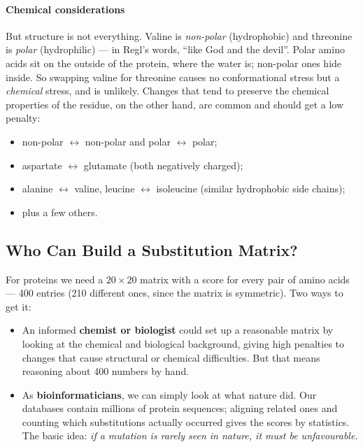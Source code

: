 \documentclass[11pt, oneside]{book}
\let\originalsubsection\subsection
\renewcommand{\subsection}{\Needspace{6\baselineskip}\originalsubsection}
\begin{document}
\paragraph{Chemical considerations}
But structure is not everything. Valine is \emph{non-polar} (hydrophobic) and
threonine is \emph{polar} (hydrophilic) --- in Regl's words, ``like God and
the devil''. Polar amino acids sit on the outside of the protein, where the
water is; non-polar ones hide inside. So swapping valine for threonine causes
no conformational stress but a \emph{chemical} stress, and is unlikely. Changes
that tend to preserve the chemical properties of the residue, on the other
hand, are common and should get a low penalty:
\begin{itemize}
  \item non-polar $\leftrightarrow$ non-polar and polar $\leftrightarrow$ polar;
  \item aspartate $\leftrightarrow$ glutamate (both negatively charged);
  \item alanine $\leftrightarrow$ valine, leucine $\leftrightarrow$ isoleucine
    (similar hydrophobic side chains);
  \item plus a few others.
\end{itemize}

\subsection{Who Can Build a Substitution Matrix?}

For proteins we need a $20 \times 20$ matrix with a score for every pair of
amino acids --- 400 entries (210 different ones, since the matrix is
symmetric). Two ways to get it:
\begin{itemize}
  \item An informed \textbf{chemist or biologist} could set up a reasonable
    matrix by looking at the chemical and biological background, giving high
    penalties to changes that cause structural or chemical difficulties.
    But that means reasoning about 400 numbers by hand.
  \item As \textbf{bioinformaticians}, we can simply look at what nature did.
    Our databases contain millions of protein sequences; aligning related ones
    and counting which substitutions actually occurred gives the scores by
    statistics. The basic idea: \emph{if a mutation is rarely seen in nature,
    it must be unfavourable.}
\end{itemize}
\end{document}
